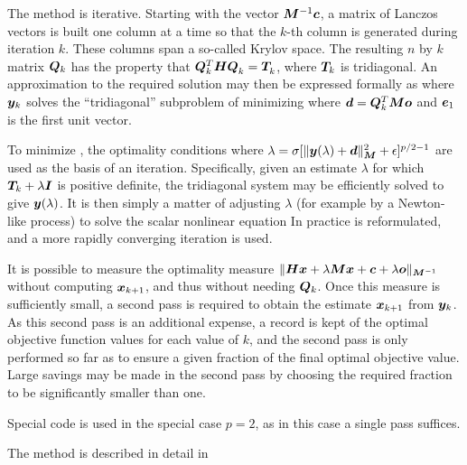 \documentclass{galahad}
\begin{document}
\noindent
The method is iterative. Starting  with the vector ${\bm{M}}^{-1} {\bm{c}}$,
a matrix of Lanczos vectors is built one column at a time
so that the $k$-th column is generated during
iteration $k$. These columns span a so-called Krylov space.
The resulting $n$ by $k$ matrix ${\bm{Q}}_k $ has the
property that ${\bm{Q}}_{k}^T {\bm{H}} {\bm{Q}}_k^{}  =  {\bm{T}}_{k}^{}$,
where ${\bm{T}}_k$ is tridiagonal. An approximation to the
required solution may then be expressed formally as
where ${\bm{y}}_k $ solves the ``tridiagonal'' subproblem of minimizing
where ${\bm{d}} = {\bm{Q}}_k^T {\bm{M}} {\bm{o}}$ and ${\bm{e}}_1$ is the first unit vector.

To minimize , the optimality conditions
where $\lambda = \sigma [ \|{\bm{y}}(\lambda)+{\bm{d}}\|_{{\bm{M}}}^2 + \epsilon]^{p/2-1}$
are used as the basis of an iteration. Specifically, given an estimate
$\lambda$ for which $ {\bm{T}}_k + \lambda {\bm{I}}$ is positive definite,
the tridiagonal system  may be efficiently solved to give
${\bm{y}}(\lambda)$. It is then simply a matter of adjusting $\lambda$
(for example by a Newton-like process) to solve the scalar nonlinear equation
In practice  is reformulated, and a more rapidly converging iteration is
used.

It is possible to measure the optimality measure
$\|{\bm{H}} {\bm{x}}  +  \lambda {\bm{M}} {\bm{x}}  +  {\bm{c}} + \lambda {\bm{o}}\|_{{\bm{M}}^{-1}}$
without computing ${\bm{x}}_{k+1}$, and thus without
needing ${\bm{Q}}_k $. Once this measure is sufficiently small, a second pass
is required to obtain the estimate ${\bm{x}}_{k+1} $ from ${\bm{y}}_k $.
As this second pass is an additional expense, a record is kept of the
optimal objective function values for each value of $k$, and the second
pass is only performed so far as to ensure a given fraction of the
final optimal objective value. Large savings may be made in the second
pass by choosing the required fraction to be significantly smaller than one.

Special code is used in the special case $p=2$, as in this case a single
pass suffices.

\galreference
The method is described in detail in
\vspace*{1mm}
\end{document}
